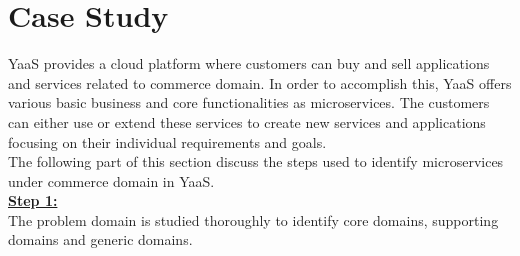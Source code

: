  \section{Case Study}\label{section:hybris_architecture/example_scenario}
 \acrshort{YaaS} provides a cloud platform where customers can buy and sell applications and services related to commerce domain. In order to accomplish this, \acrshort{YaaS} offers various basic business and core functionalities as microservices. The customers can either use or extend these services to create new services and applications focusing on their individual requirements and goals.
 \\
The following part of this section discuss the steps used to identify microservices under commerce domain in \acrshort{YaaS}.
\\
\textbf{\underline{Step 1:}}
\\
The problem domain is studied thoroughly to identify core domains, supporting domains and generic domains.
